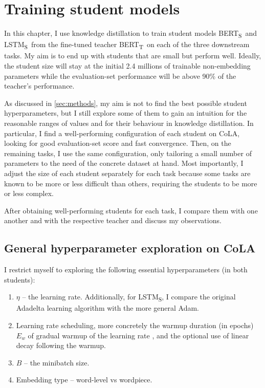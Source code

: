 \documentclass[bsc,frontabs,singlespacing,parskip,deptreport]{infthesis}
\def\BERTT{BERT\textsubscript{T}}
\def\BERTS{BERT\textsubscript{S}}
\def\LSTMS{LSTM\textsubscript{S}}
\begin{document}
\chapter{Training student models}{
  In this chapter, I use knowledge distillation to train student models \BERTS~and \LSTMS~from the fine-tuned teacher \BERTT~on each of the three downstream tasks.
  My aim is to end up with students that are small but perform well. Ideally, the student size will stay at the initial 2.4 millions of trainable non-embedding parameters while the evaluation-set performance will be above 90\% of the teacher's performance.

  As discussed in \autoref{sec:methods}, my aim is not to find the best possible student hyperparameters, but I still explore some of them to gain an intuition for the reasonable ranges of values and for their behaviour in knowledge distillation.
  In particular, I find a well-performing configuration of each student on CoLA, looking for good evaluation-set score and fast convergence. Then, on the remaining tasks, I use the same configuration, only tailoring a small number of parameters to the need of the concrete dataset at hand. Most importantly, I adjust the size of each student separately for each task because some tasks are known to be more or less difficult than others, requiring the students to be more or less complex.

  After obtaining well-performing students for each task, I compare them with one another and with the respective teacher and discuss my observations.

  \section{General hyperparameter exploration on CoLA}{
    \label{sec:hparam-general}

    I restrict myself to exploring the following essential hyperparameters (in both students):
    \begin{enumerate}
      \item $\eta$ -- the learning rate. Additionally, for \LSTMS, I compare the original Adadelta learning algorithm with the more general Adam.
      \item Learning rate scheduling, more concretely the warmup duration (in epochs) $E_{w}$ of gradual warmup of the learning rate \citep{Goyal_2017}, and the optional use of linear decay following the warmup.
      \item $B$ -- the minibatch size.
      \item Embedding type -- word-level vs wordpiece.
    \end{enumerate}

}}
\end{document}
